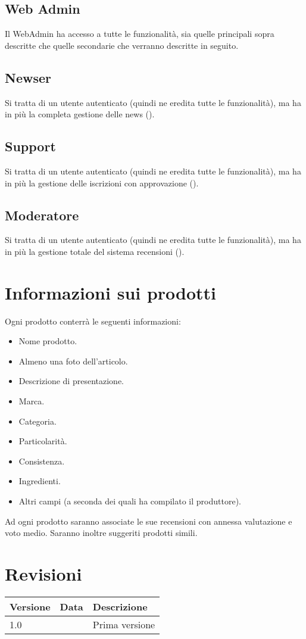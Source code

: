 \subsection{Web Admin}
Il WebAdmin ha accesso a tutte le funzionalità, sia quelle principali sopra descritte che quelle secondarie che verranno descritte in seguito.

\subsection{Newser}
Si tratta di un utente autenticato (quindi ne eredita tutte le funzionalità), ma ha in più la completa gestione delle news ().

\subsection{Support}
Si tratta di un utente autenticato (quindi ne eredita tutte le funzionalità), ma ha in più la gestione delle iscrizioni con approvazione ().

\subsection{Moderatore}
Si tratta di un utente autenticato (quindi ne eredita tutte le funzionalità), ma ha in più la gestione totale del sistema recensioni ().

\section{Informazioni sui prodotti}
Ogni prodotto conterrà le seguenti informazioni:
\begin{itemize}
	\item Nome prodotto. 
	\item Almeno una foto dell’articolo.
	\item  Descrizione di presentazione.
	\item  Marca.
	\item Categoria.
	\item Particolarità.
	\item Consistenza.
	\item Ingredienti.
	\item Altri campi (a seconda dei quali ha compilato il produttore).
\end{itemize}
Ad ogni prodotto saranno associate le sue recensioni con annessa valutazione e voto medio. Saranno inoltre suggeriti prodotti simili.

\section{Revisioni}
\begin{center}
	\begin{tabular}{lll}
		\toprule
		Versione & Data & Descrizione \\
		\midrule
		1.0 & \displaydate{versioneuno} & Prima versione \\
		\bottomrule
	\end{tabular}
\end{center}
